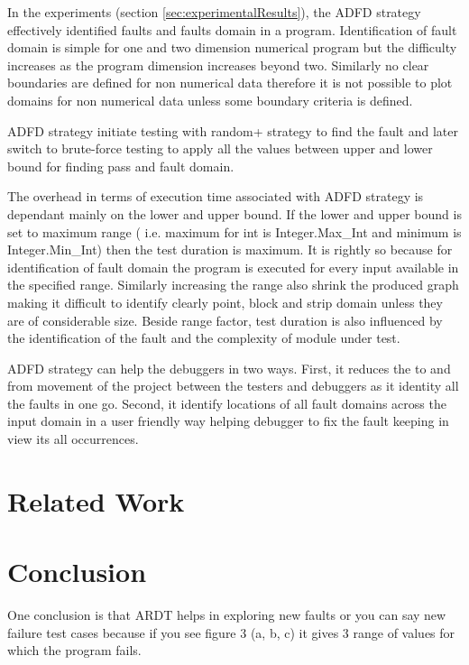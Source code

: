 \documentclass{acm_proc_article-sp}
\begin{document}
In the experiments (section \ref{sec:experimentalResults}), the ADFD strategy effectively identified faults and faults domain in a program. Identification of fault domain is simple for one and two dimension numerical program but the difficulty increases as the program dimension increases beyond two. Similarly no clear boundaries are defined for non numerical data therefore it is not possible to plot domains for non numerical data unless some boundary criteria is defined.

ADFD strategy initiate testing with random+ strategy to find the fault and later switch to brute-force testing to apply all the values between upper and lower bound for finding pass and fault domain.

The overhead in terms of execution time associated with ADFD strategy is dependant mainly on the lower and upper bound. If the lower and upper bound is set to maximum range ( i.e. maximum for int is Integer.Max\_Int and minimum is Integer.Min\_Int) then the test duration is maximum.    It is rightly so because for identification of fault domain the program is executed for every input available in the specified range. Similarly increasing the range also shrink the produced graph making it difficult to identify clearly point, block and strip domain unless they are of considerable size. Beside range factor, test duration is also influenced by the identification of the fault and the complexity of module under test.

ADFD strategy can help the debuggers in two ways. First, it reduces the to and from movement of the project between the testers and debuggers as it identity all the faults in one go. Second, it identify locations of all fault domains across the input domain in a user friendly way helping debugger to fix the fault keeping in view its all occurrences.





\section{Related Work} \label{sec:relatedWork}



\section{Conclusion} \label{sec:conclusion}
One conclusion is that ARDT helps in exploring new faults or you can say new failure test cases because if you see figure 3 (a, b, c) it gives 3 range of values for which the program fails. \\
\end{document}
